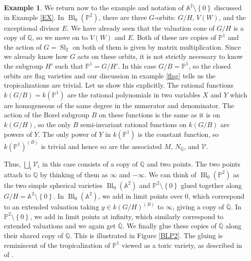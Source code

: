 \documentclass[12pt,twoside,cd]{amsart}
\theoremstyle{definition}
\newtheorem{example}[theorem]{Example}
\begin{document}
\begin{example}\label{A2}
We return now to the example and notation of $\mathbb{A}^2\setminus {\left\lbrace {0} \right\rbrace}$ discussed in Example \ref{EX}.
In ${\operatorname{Bl}}_0(\mathbb{P}^2)$, there are three $G$-orbits: $G/H$, $V(W)$, and the exceptional divisor $E$. We have already seen that the valuation cone of $G/H$ is a copy of $\mathbb{Q}$, so we move on to $V(W)$ and $E$.
Both of these are copies of $\mathbb{P}^1$ and the action of $G = {\operatorname{Sl}}_2$ on both of them is given by matrix multiplication.
Since we already know how $G$ acts on these orbits, it is not strictly necessary to know the subgroup $H'$ such that $\mathbb{P}^1 = G/H'$.
In this case $G/B = \mathbb{P}^1$, so the closed orbits are flag varieties and our discussion in example \ref{flag} tells us the tropicalizations are trivial.
Let us show this explicitly.
The rational functions $k(G/B) = k(\mathbb{P}^1)$ are the rational polynomials in two variables $X$ and $Y$ which are homogeneous of the same degree in the numerator and denominator.
The action of the Borel subgroup $B$ on these functions is the same as it is on $k(G/H)$, so the only $B$ semi-invariant rational functions on $k(G/B)$ are powers of $Y$.
The only power of $Y$ in $k(\mathbb{P}^1)$ is the constant function, so $k(\mathbb{P}^1)^{(B)}$ is trivial and hence so are the associated $M$, $N_\mathbb{Q}$, and $\mathcal{V}$.

Thus, $\bigsqcup_i \mathcal{V}_i$ in this case consists of a copy of $\mathbb{Q}$ and two points.
The two points attach to $\mathbb{Q}$ by thinking of them as $\infty$ and $-\infty$.
We can think of ${\operatorname{Bl}}_0(\mathbb{P}^2)$ as the two simple spherical varieties ${\operatorname{Bl}}_0(\mathbb{A}^2)$ and $\mathbb{P}^2 \setminus {\left\lbrace {0} \right\rbrace}$ glued together along $G/H = \mathbb{A}^2 \setminus {\left\lbrace {0} \right\rbrace}$.
In ${\operatorname{Bl}}_0(\mathbb{A}^2)$, we add in limit points over 0, which correspond to an extended valuation taking $y \in k(G/H)^{(B)}$ to $\infty$, giving a copy of $\overline{\mathbb{Q}}$.
In $\mathbb{P}^2 \setminus {\left\lbrace {0} \right\rbrace}$, we add in limit points at infinity, which similarly correspond to extended valuations and we again get $\overline{\mathbb{Q}}$.
We finally glue these copies of $\overline{\mathbb{Q}}$ along their shared copy of $\mathbb{Q}$.
This is illustrated in Figure \ref{BLP2}. The gluing is reminiscent of the tropicalization of $\mathbb{P}^1$ viewed as a toric variety, as described in  of \cite{MS}.


\end{example}
\end{document}
